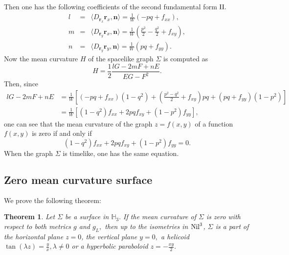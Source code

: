 \documentclass[11pt]{amsart}
\newtheorem{thm}[prop]{Theorem}
\begin{document}
Then one has the following coefficients of the second fundamental
form ${\rm II}.$
\begin{eqnarray*}
l &=&\langle D_{{\mathbf{r}}_x}{\mathbf{r}}_x, {\mathbf{n}}\rangle =
\frac1{W}\left(-pq+f_{xx}\right),\\
m &=&\langle D_{{\mathbf{r}}_y}{\mathbf{r}}_x, {\mathbf{n}}\rangle =
\frac1{W}\left(\frac{p^2}2-\frac{q^2}2+f_{xy}\right),\\
n &=&\langle D_{{\mathbf{r}}_y}{\mathbf{r}}_y, {\mathbf{n}}\rangle =
\frac1{W}\left(pq+f_{yy}\right).
\end{eqnarray*}
Now the mean curvature $H$ of the spacelike graph $\Sigma$ is
computed as
\[
H=\frac12\frac{lG-2mF+nE}{EG-F^2}.
\]
Then, since
\[
\begin{split}
lG-2mF+nE &=\frac1{W}\left[(-pq+f_{xx})(1-q^2) +
\left(\frac{p^2-q^2}2+f_{xy}\right)pq
+(pq+f_{yy})(1-p^2)\right]\\
&=\frac1{W}\left[(1-q^2)f_{xx}+2pqf_{xy}+(1-p^2)f_{yy}\right],
\end{split}
\]
one can see that the mean curvature of the graph $z=f(x,y)$ of a
function $f(x,y)$ is zero if and only if
$$(1-q^2)f_{xx}+2pqf_{xy}+(1-p^2)f_{yy}=0.$$
When the graph $\Sigma$ is timelike, one has the same equation.

\subsection{Zero mean curvature surface}

We prove the following theorem:

\begin{thm}\label{thm:minmax} Let $\Sigma$ be a surface in ${\mathbb{H}}_3.$
If the mean curvature of $\Sigma$ is zero with respect to both
metrics $g$ and $g_L,$ then up to the isometries in $\text{\rm
Nil}^3$, $\Sigma$ is a part of the horizontal plane $z=0$, the
vertical plane $y=0,$ a helicoid $\tan(\lambda z)=\frac{y}{x},
\lambda\ne0$ or a hyperbolic paraboloid $z=-\frac{xy}2.$
\end{thm}
\end{document}
